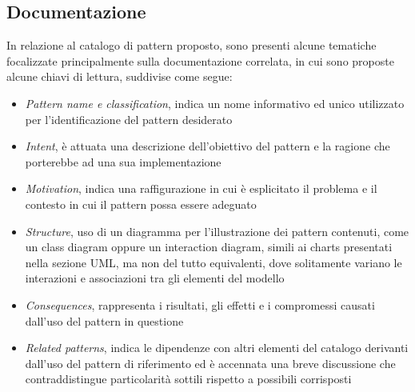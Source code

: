 \documentclass{article}
\begin{document}
\subsection*{Documentazione}
\large
In relazione al catalogo di pattern proposto, sono presenti alcune tematiche focalizzate principalmente sulla documentazione correlata, in cui sono proposte alcune chiavi di lettura, suddivise come segue:
\begin{itemize}[label={-}]
    \itemsep0em
    \item \textit{Pattern name e classification}, indica un nome informativo ed unico utilizzato per l'identificazione del pattern desiderato
    \item \textit{Intent}, è attuata una descrizione dell'obiettivo del pattern e la ragione che porterebbe ad una sua implementazione
    \item \textit{Motivation}, indica una raffigurazione in cui è esplicitato il problema e il contesto in cui il pattern possa essere adeguato
    \item \textit{Structure}, uso di un diagramma per l'illustrazione dei pattern contenuti, come un class diagram oppure un interaction diagram, simili ai charts presentati nella sezione UML, ma non del tutto equivalenti, dove solitamente variano le interazioni e associazioni tra gli elementi del modello
    \item \textit{Consequences}, rappresenta i risultati, gli effetti e i compromessi causati dall'uso del pattern in questione
    \item \textit{Related patterns}, indica le dipendenze con altri elementi del catalogo derivanti dall'uso del pattern di riferimento ed è accennata una breve discussione che contraddistingue particolarità sottili rispetto a possibili corrisposti
\end{itemize} 
\end{document}
